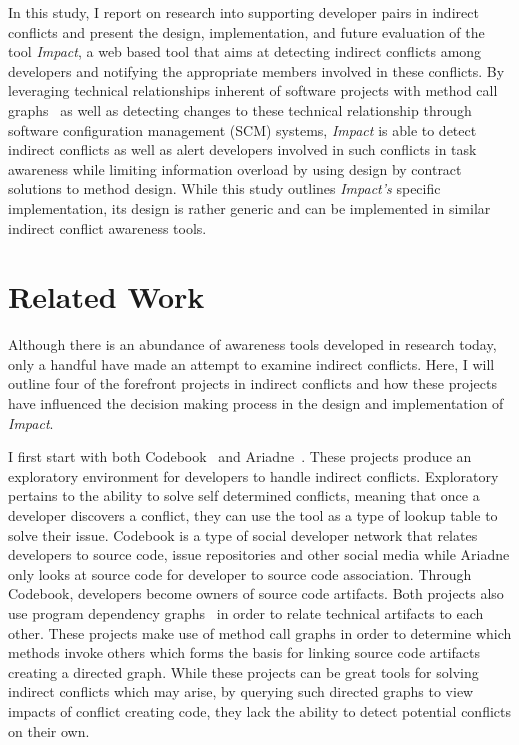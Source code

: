 In this study, I report on research into supporting developer pairs in indirect conflicts
and present the design, implementation, and future evaluation of the tool \textit{Impact},
a web based tool that aims at detecting indirect conflicts among developers
and notifying the appropriate members involved in these conflicts.
By leveraging technical relationships inherent of 
software projects with method call graphs~\cite{Lakhotia:1993:CCM}
as well as detecting changes
to these technical relationship through software configuration management
(SCM) systems, \textit{Impact} is able to detect indirect conflicts as well as
alert developers involved in such conflicts in task awareness while limiting information
overload by using design by contract~\cite{Meyer:1988} solutions to method design. While this study
outlines \textit{Impact's} specific implementation, its design is rather
generic and can be implemented in similar indirect conflict awareness tools.

\section{Related Work}
Although there is an abundance of awareness tools developed in research
today, only a handful have made an attempt to examine indirect conflicts.
Here, I will outline four of the forefront projects in indirect conflicts
and how these projects have influenced the decision making process in
the design and implementation of \textit{Impact}.

I first start with both Codebook~\cite{Begel:2010:CDE} and 
Ariadne~\cite{Trainer:2005:BGT}. These projects produce an exploratory
environment for developers to handle indirect conflicts. Exploratory
pertains to the ability to solve self determined conflicts, meaning that
once a developer discovers a conflict, they can use the tool as a type of
lookup table to solve their issue. Codebook is a type of social developer
network that relates developers to source code, issue repositories and
other social media while Ariadne only looks at source code for developer
to source code association. Through Codebook, developers become
owners of source code artifacts. Both projects also use program 
dependency graphs~\cite{Horwitz:1992:UPD}
in order to relate technical artifacts to each other. These projects make 
use of method call graphs in order to 
determine which methods invoke others which forms the basis for 
linking source code artifacts creating a directed graph. While these 
projects can be great tools 
for solving indirect conflicts which may arise, by querying such directed
graphs to view impacts of conflict creating code, they lack the ability to
detect potential conflicts on their own.

